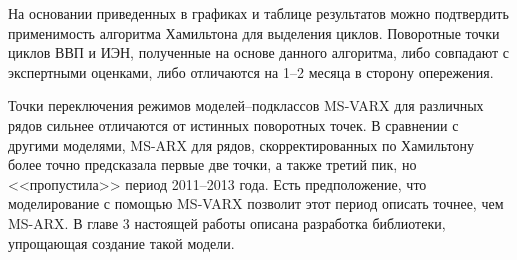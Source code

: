 \documentclass[a4paper,14pt]{extreport}
\begin{document}
	На основании приведенных в графиках и таблице результатов можно подтвердить применимость алгоритма Хамильтона для выделения циклов. Поворотные точки циклов ВВП и ИЭН, полученные на основе данного алгоритма, либо совпадают с экспертными оценками, либо отличаются на 1--2 месяца в сторону опережения.
	
	Точки переключения режимов моделей--подклассов MS-VARX для различных рядов сильнее отличаются от истинных поворотных точек. В сравнении с другими моделями, MS-ARX для рядов, скорректированных по Хамильтону более точно предсказала первые две точки, а также третий пик, но <<пропустила>> период 2011--2013 года. Есть предположение, что моделирование с помощью MS-VARX позволит этот период описать точнее, чем MS-ARX. В главе 3 настоящей работы описана разработка библиотеки, упрощающая создание такой модели.
	
	
	
\end{document}
